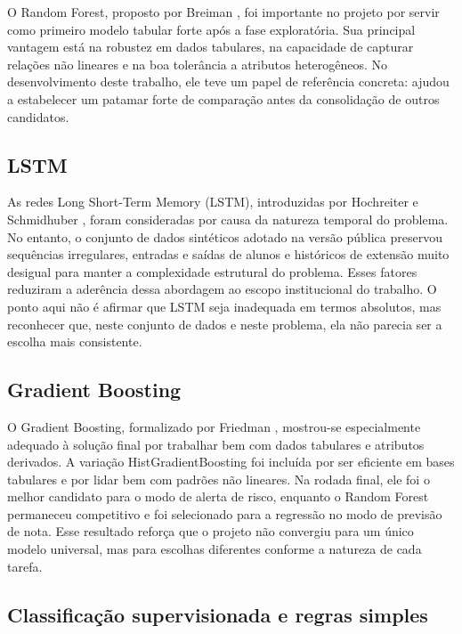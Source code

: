 O Random Forest, proposto por Breiman \cite{breiman2001}, foi importante no projeto por servir como primeiro modelo tabular forte ap\'os a fase explorat\'oria. Sua principal vantagem est\'a na robustez em dados tabulares, na capacidade de capturar rela\c{c}\~oes n\~ao lineares e na boa toler\^ancia a atributos heterog\^eneos. No desenvolvimento deste trabalho, ele teve um papel de refer\^encia concreta: ajudou a estabelecer um patamar forte de compara\c{c}\~ao antes da consolida\c{c}\~ao de outros candidatos.

\subsection{LSTM}
\label{subsec:lstm}

As redes Long Short-Term Memory (LSTM), introduzidas por Hochreiter e Schmidhuber \cite{hochreiter1997}, foram consideradas por causa da natureza temporal do problema. No entanto, o conjunto de dados sintéticos adotado na vers\~ao p\'ublica preservou sequ\^encias irregulares, entradas e sa\'idas de alunos e hist\'oricos de extens\~ao muito desigual para manter a complexidade estrutural do problema. Esses fatores reduziram a ader\^encia dessa abordagem ao escopo institucional do trabalho. O ponto aqui n\~ao \'e afirmar que LSTM seja inadequada em termos absolutos, mas reconhecer que, neste conjunto de dados e neste problema, ela n\~ao parecia ser a escolha mais consistente.

\subsection{Gradient Boosting}
\label{subsec:gradient-boosting}

O Gradient Boosting, formalizado por Friedman \cite{friedman2001}, mostrou-se especialmente adequado \`a solu\c{c}\~ao final por trabalhar bem com dados tabulares e atributos derivados. A varia\c{c}\~ao HistGradientBoosting foi inclu\'ida por ser eficiente em bases tabulares e por lidar bem com padr\~oes n\~ao lineares. Na rodada final, ele foi o melhor candidato para o modo de alerta de risco, enquanto o Random Forest permaneceu competitivo e foi selecionado para a regress\~ao no modo de previs\~ao de nota. Esse resultado refor\c{c}a que o projeto n\~ao convergiu para um \'unico modelo universal, mas para escolhas diferentes conforme a natureza de cada tarefa.

\subsection{Classifica\c{c}\~ao supervisionada e regras simples}
\label{subsec:classificacao-regras}

